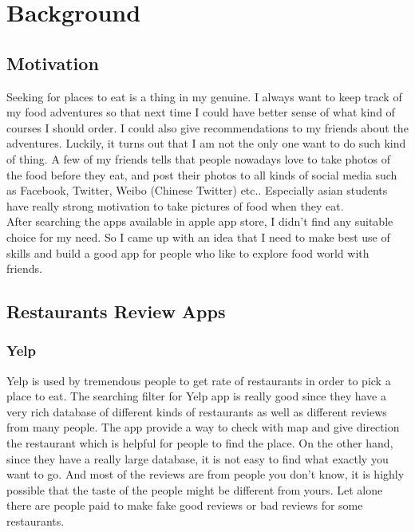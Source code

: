 \chapter{Background}
\section{Motivation} %
\label{sec:motivation}

Seeking for places to eat is a thing in my genuine. I always want to keep track of my food adventures so that next time I could have better sense of what kind of courses I should order. I could also give recommendations to my friends about the adventures. Luckily, it turns out that I am not the only one want to do such kind of thing. A few of my friends tells that people nowadays love to take photos of the food before they eat, and post their photos to all kinds of social media such as Facebook, Twitter, Weibo (Chinese Twitter) etc.. Especially asian students have really strong motivation to take pictures of food when they eat. \\

After searching the apps available in apple app store, I didn't find any suitable choice for my need. So I came up with an idea that I need to make best use of skills and build a good app for people who like to explore food world with friends. 
\newpage

\section{Restaurants Review Apps} %
\label{sec:current_review_apps}

\subsection{Yelp} %
\label{sub:yelp}

Yelp is used by tremendous people to get rate of restaurants in order to pick a place to eat. The searching filter for Yelp app is really good since they have a very rich database of different kinds of restaurants as well as different reviews from many people. The app provide a way to check with map and give direction the restaurant which is helpful for people to find the place. On the other hand, since they have a really large database, it is not easy to find what exactly you want to go. And most of the reviews are from people you don't know, it is highly possible that the taste of the people might be different from yours. Let alone there are people paid to make fake good reviews or bad reviews for some restaurants. \\

